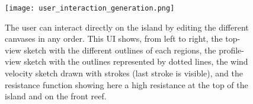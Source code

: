 \begin{figure}[tb]
    \centering
    \texttt{[image: user\_interaction\_generation.png]}
    \caption{The user can interact directly on the island by editing the different canvases in any order. This UI shows, from left to right, the top-view sketch with the different outlines of each regions, the profile-view sketch with the outlines represented by dotted lines, the wind velocity sketch drawn with strokes (last stroke is visible), and the resistance function showing here a high resistance at the top of the island and on the front reef.}
    \label{fig:coral-island_wind-from-strokes-interaction}
\end{figure}











